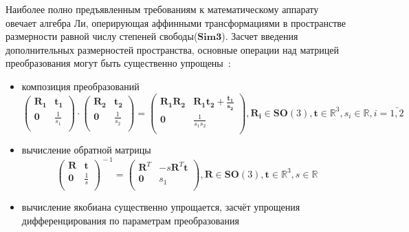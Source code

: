 Наиболее полно предъявленным требованиям к математическому аппарату овечает алгебра Ли, оперирующая аффинными трансформациями в пространстве размерности равной числу степеней свободы($\mathbf{Sim3}$). Засчет введения дополнительных размерностей пространства, основные операции над матрицей преобразования могут быть существенно упрощены~\cite{lieGroups}:
\begin{itemize}
    \item композиция преобразований
    \begin{equation}
        \begin{pmatrix}
        \mathbf{R_1} & \mathbf{t_1}  \\
        \mathbf{0} & \frac{1}{s_1} \\
        \end{pmatrix}
        \cdot
        \begin{pmatrix}
        \mathbf{R_2} & \mathbf{t_2}  \\
        \mathbf{0} & \frac{1}{s_2} \\
        \end{pmatrix}
        =
        \begin{pmatrix}
        \mathbf{R_1}\mathbf{R_2} & \mathbf{R_1}\mathbf{t_2} + \frac{\mathbf{t_1}}{\mathbf{s_2}}  \\
        \mathbf{0} & \frac{1}{s_1 s_2} \\
        \end{pmatrix}, \mathbf{R_i} \in \mathbf{SO}(3), \mathbf{t} \in \mathbb{R}^3, s_i \in \mathbb{R}, i = \bar{1,2}
    \end{equation}
    \item вычисление обратной матрицы
    \begin{equation}
        \begin{pmatrix}
        \mathbf{R} & \mathbf{t}  \\
        \mathbf{0} & \frac{1}{s} \\
        \end{pmatrix}
        ^{\!\!-1}
        =
        \begin{pmatrix}
        \mathbf{R}^T & -s\mathbf{R}^T\mathbf{t} \\
        \mathbf{0} & s_1 \\
        \end{pmatrix}, \mathbf{R} \in \mathbf{SO}(3), \mathbf{t} \in \mathbb{R}^3, s \in \mathbb{R}
    \end{equation}
    \item вычисление якобиана существенно упрощается, засчёт упрощения дифференцирования по параметрам преобразования

\end{itemize}
